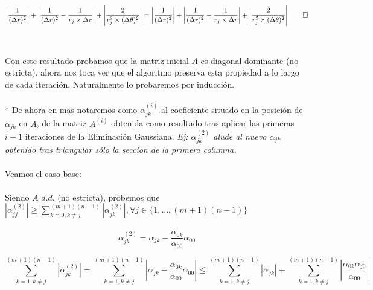 \begin{equation}
 \left | \frac{1}{(\Delta r)^2} \right | + \left | \frac{1}{(\Delta r)^2} - \frac{1}{r_j \times \Delta r} \right | + \left | \frac{2}{r_j^2 \times (\Delta \theta)^2} \right | = \left | \frac{1}{(\Delta r)^2} \right | + \left | \frac{1}{(\Delta r)^2} - \frac{1}{r_j \times \Delta r} \right | +  \left | \frac{2}{r_j^2 \times (\Delta \theta)^2} \right | \qed
\end{equation}
\\
\\
Con este resultado probamos que la matriz inicial $A$ es diagonal dominante (no estricta), ahora nos toca ver que el algoritmo preserva esta propiedad a lo largo de cada iteraci\'on. Naturalmente lo probaremos por inducci\'on.
\\
\\
* De ahora en mas notaremos como $\alpha_{jk}^{(i)}$ al coeficiente situado en la posición de $\alpha_{jk}$ en  $A$, de la matriz $A^{(i)}$ obtenida como resultado tras aplicar las primeras $i-1$ iteraciones de la Eliminaci\'on Gaussiana. \textit{Ej: $\alpha_{jk}^{(2)}$ alude al nuevo $\alpha_{jk}$ obtenido tras triangular s\'olo la seccion de la primera columna.}
\\  
\\
\underline{Veamos el caso base:}
\\
\\
Siendo $A$ $d.d.$ (no estricta), probemos que $\left | \alpha_{jj}^{(2)} \right | \geq \sum_{k=0,k \neq j}^{(m+1)(n-1)} \left | \alpha_{jk}^{(2)} \right |, \forall j \in \{1,...,(m+1)(n-1)\}$
\\
\\
\begin{equation}
\alpha_{jk}^{(2)} =  \alpha_{jk} - \frac{\alpha_{0k}}{\alpha_{00}}\alpha_{00}
\end{equation}

\begin{equation}
\sum_{k=1,k \neq j}^{(m+1)(n-1)} \left | \alpha_{jk}^{(2)} \right | = \sum_{k=1,k \neq j}^{(m+1)(n-1)} \left | \alpha_{jk} - \frac{\alpha_{0k}}{\alpha_{00}}\alpha_{00} \right | \leq \sum_{k=1,k \neq j}^{(m+1)(n-1)} \left | \alpha_{jk} \right | + \sum_{k=1,k \neq j}^{(m+1)(n-1)} \left | \frac{\alpha_{0k}\alpha_{j0}}{\alpha_{00}} \right | 
\end{equation}

